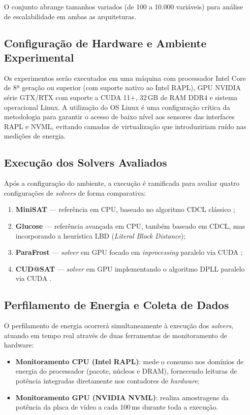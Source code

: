 \documentclass[12pt]{article}
\begin{document}
O conjunto abrange tamanhos variados (de 100 a 10.000 variáveis) para análise de escalabilidade em ambas as arquiteturas.

\subsection{Configuração de Hardware e Ambiente Experimental}
Os experimentos serão executados em uma máquina com processador Intel Core de 8ª geração ou superior (com suporte nativo ao Intel RAPL), GPU NVIDIA série GTX/RTX com suporte a CUDA 11+, 32\,GB de RAM DDR4 e sistema operacional Linux. A utilização do OS Linux é uma configuração crítica da metodologia para garantir o acesso de baixo nível aos sensores das interfaces RAPL e NVML, evitando camadas de virtualização que introduziriam ruído nas medições de energia.

\subsection{Execução dos Solvers Avaliados}
Após a configuração do ambiente, a execução é ramificada para avaliar quatro configurações de \textit{solvers} de forma comparativa:
\begin{enumerate}
    \item \textbf{MiniSAT} — referência em CPU, baseado no algoritmo CDCL clássico \cite{moskewicz:2001};
    \item \textbf{Glucose} — referência avançada em CPU, também baseado em CDCL, mas incorporando a heurística LBD (\textit{Literal Block Distance});
    \item \textbf{ParaFrost} — \textit{solver} em GPU focado em \textit{inprocessing} paralelo via CUDA \cite{parafrost:tacas:2021};
    \item \textbf{CUD@SAT} — \textit{solver} em GPU implementando o algoritmo DPLL paralelo via CUDA \cite{cudaatsat:2013}.
\end{enumerate}

\subsection{Perfilamento de Energia e Coleta de Dados}
O perfilamento de energia ocorrerá simultaneamente à execução dos \textit{solvers}, atuando em tempo real através de duas ferramentas de monitoramento de hardware:
\begin{itemize}
    \item \textbf{Monitoramento CPU (Intel RAPL)}: mede o consumo nos domínios de energia do processador (pacote, núcleos e DRAM), fornecendo leituras de potência integradas diretamente nos contadores de \textit{hardware};
    \item \textbf{Monitoramento GPU (NVIDIA NVML)}: realiza amostragens da potência da placa de vídeo a cada 100\,ms durante toda a execução.
\end{itemize}
\end{document}
